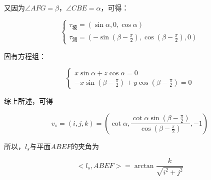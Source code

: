 又因为$\angle AFG=\beta$，$\angle CBE=\alpha$，可得：

\begin{equation}
    \begin{cases}
        \tau_\text{坡} = (\sin\alpha, 0, \cos\alpha) \\
        \tau_\text{测} = (-\sin(\beta-\frac{\pi}{2}), \cos(\beta-\frac{\pi}{2}), 0)
    \end{cases}
\end{equation}

固有方程组：

\begin{equation}
    \begin{cases}
        x\sin\alpha + z\cos\alpha = 0 \\
        -x\sin(\beta-\frac{\pi}{2}) + y \cos(\beta-\frac{\pi}{2}) = 0
    \end{cases}
\end{equation}

综上所述，可得

\begin{equation}
    v_s 
    = (i, j, k)
    = \left( 
            \cot \alpha, 
            \frac{\cot\alpha \sin\left(\beta - \frac{\pi}{2}\right)}{\cos\left(\beta-\frac{\pi}{2}\right)},
            -1
            \right)
\end{equation}

所以，$l_s$与平面$ABEF$的夹角为

\begin{equation}
    <l_s, ABEF> = \arctan\frac{k}{\sqrt{i^2+j^2}}
\end{equation}

